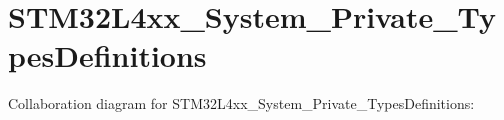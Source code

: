 \hypertarget{group__STM32L4xx__System__Private__TypesDefinitions}{}\section{S\+T\+M32\+L4xx\+\_\+\+System\+\_\+\+Private\+\_\+\+Types\+Definitions}
\label{group__STM32L4xx__System__Private__TypesDefinitions}
Collaboration diagram for S\+T\+M32\+L4xx\+\_\+\+System\+\_\+\+Private\+\_\+\+Types\+Definitions\+:
